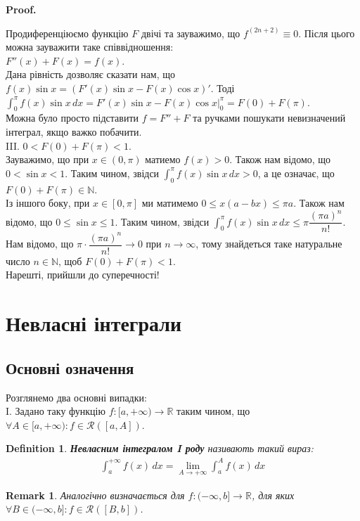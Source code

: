 \documentclass[a4paper, 10pt]{article}
\makeatletter
\def\qed{$\blacksquare$}
\theoremstyle{theoremdd}
\theoremstyle{theoremdd}
\theoremstyle{theoremdd}
\newtheorem{definition}[theorem]{Definition}
\theoremstyle{theoremdd}
\theoremstyle{theoremdd}
\theoremstyle{theoremdd}
\theoremstyle{theoremdd}
\newtheorem{remark}[theorem]{Remark}
\theoremstyle{theoremdd}
\theoremstyle{theoremdd}
\renewenvironment{proof}[1][Proof.\\]{\par
\pushQED{\hfill \qed}%
\normalfont \topsep6\p@\@plus6\p@\relax
\trivlist
\item\relax
{\bfseries
#1\@addpunct{.}}\hspace\labelsep\ignorespaces
}{%
\popQED\endtrivlist\@endpefalse
}
\makeatother
\begin{document}
\begin{proof}
Продиференціюємо функцію $F$ двічі та зауважимо, що $f^{(2n+2)} \equiv 0$. Після цього можна зауважити таке співвідношення:\\
$F''(x) + F(x) = f(x)$.\\
Дана рівність дозволяє сказати нам, що $f(x) \sin x = (F'(x) \sin x - F(x) \cos x)'$. Тоді\\
$\displaystyle\int_0^{\pi} f(x)\sin x\,dx = F'(x) \sin x - F(x) \cos x \Big|_{0}^{\pi} = F(0) + F(\pi)$.\\
Можна було просто підставити $f = F'' + F$ та ручками пошукати невизначений інтеграл, якщо важко побачити.
\bigskip \\
III. \textit{$0 < F(0) + F(\pi) < 1$}.\\
Зауважимо, що при $x \in (0,\pi)$ матиемо $f(x) > 0$. Також нам відомо, що $0 < \sin x < 1$. Таким чином, звідси $\displaystyle\int_0^{\pi} f(x) \sin x\,dx > 0$, а це означає, що $F(0) + F(\pi) \in \mathbb{N}$.\\
Із іншого боку, при $x \in [0,\pi]$ ми матимемо $0 \leq x(a-bx) \leq \pi a$. Також нам відомо, що $0 \leq \sin x \leq 1$. Таким чином, звідси $\displaystyle\int_0^{\pi} f(x) \sin x\,dx \leq \pi \dfrac{(\pi a)^n}{n!}$. Нам відомо, що $\pi \cdot \dfrac{(\pi a)^n}{n!} \to 0$ при $n \to \infty$, тому знайдеться таке натуральне число $n \in \mathbb{N}$, щоб $F(0) + F(\pi) < 1$.
\bigskip \\
Нарешті, прийшли до суперечності!
\end{proof}
\newpage
\fi

\iffalse
\section{Невласні інтеграли}
\subsection{Основні означення}
Розглянемо два основні випадки:\\
I. Задано таку функцію $f \colon [a,+\infty) \to \mathbb{R}$ таким чином, що $\forall A \in [a,+\infty): f \in \mathcal{R}([a,A])$.
\begin{definition}
\textbf{Невласним інтегралом I роду} називають такий вираз:
\begin{align*}
\int_a^{+\infty} f(x)\,dx = \lim_{A \to +\infty} \int_a^A f(x)\,dx
\end{align*}
\end{definition}

\begin{remark}
Аналогічно визначається для $f \colon (-\infty,b] \to \mathbb{R}$, для яких $\forall B \in (-\infty,b]: f \in \mathcal{R}([B,b])$.
\end{remark}
\end{document}
